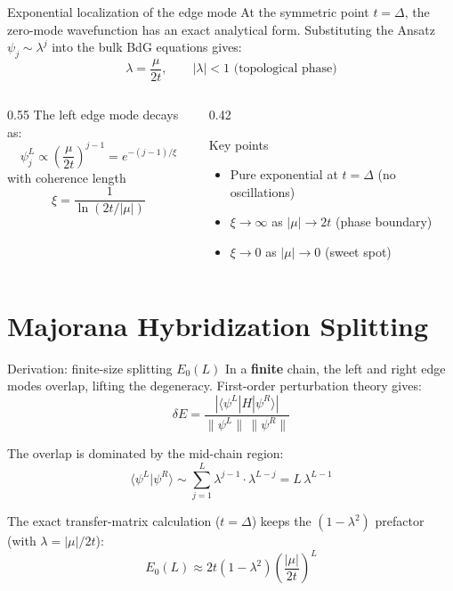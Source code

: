 \documentclass[aspectratio=169, 12pt]{beamer}
\begin{document}
\begin{frame}{Exponential localization of the edge mode}
  At the symmetric point $t = \Delta$, the zero-mode wavefunction has an exact analytical form.
  Substituting the Ansatz $\psi_j \sim \lambda^j$ into the bulk BdG equations gives:
  \[
    \lambda = \frac{\mu}{2t}, \qquad |\lambda| < 1 \text{ (topological phase)}
  \]

  \begin{columns}[T]
    \begin{column}{0.55\textwidth}
      The left edge mode decays as:
      \[
        \psi_j^L \propto \left(\frac{\mu}{2t}\right)^{j-1}
        = e^{-(j-1)/\xi}
      \]
      with coherence length
      \[
        \xi = \frac{1}{\ln(2t/|\mu|)}
      \]
    \end{column}
    \begin{column}{0.42\textwidth}
      \begin{block}{Key points}
        \begin{itemize}
          \item Pure exponential at $t=\Delta$ (no oscillations)
          \item $\xi \to \infty$ as $|\mu| \to 2t$ (phase boundary)
          \item $\xi \to 0$ as $|\mu| \to 0$ (sweet spot)
        \end{itemize}
      \end{block}
    \end{column}
  \end{columns}
\end{frame}

\section{Majorana Hybridization Splitting}

\begin{frame}{Derivation: finite-size splitting $E_0(L)$}
  In a \textbf{finite} chain, the left and right edge modes overlap, lifting the degeneracy.
  First-order perturbation theory gives:
  \[
    \delta E = \frac{|\langle \psi^L | H | \psi^R \rangle|}{\|\psi^L\|\,\|\psi^R\|}
  \]

  The overlap is dominated by the mid-chain region:
  \[
    \langle \psi^L | \psi^R \rangle \sim \sum_{j=1}^{L} \lambda^{j-1} \cdot \lambda^{L-j}
    = L\,\lambda^{L-1}
  \]

  The exact transfer-matrix calculation ($t=\Delta$) keeps the $(1-\lambda^2)$ prefactor (with $\lambda=|\mu|/2t$):
  \[
    \boxed{E_0(L) \approx 2t\left(1-\lambda^2\right)\left(\frac{|\mu|}{2t}\right)^L}
  \]
\end{frame}
\end{document}
